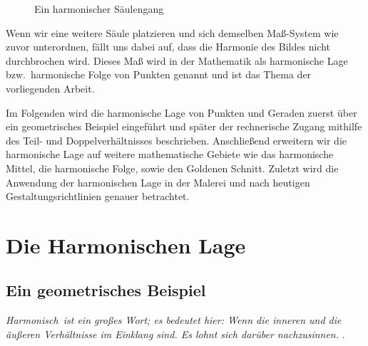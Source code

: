 \documentclass[12pt,a4paper]{article}
\begin{document}
\begin{figure}[htbp]
 \hfill
{}
\caption{Ein harmonischer Säulengang}
\label{fig:saeulen}
\end{figure}

Wenn wir eine weitere Säule platzieren und sich demselben Maß-System wie zuvor unterordnen, fällt uns dabei auf, dass die Harmonie des Bildes nicht durchbrochen wird. Dieses Maß wird in der Mathematik als harmonische Lage bzw.~harmonische Folge von Punkten genannt und ist das Thema der vorliegenden Arbeit.

Im Folgenden wird die harmonische Lage von Punkten und Geraden zuerst über ein geometrisches Beispiel eingeführt und später der rechnerische Zugang mithilfe des Teil- und Doppelverhältnisses beschrieben. Anschließend erweitern wir die harmonische Lage auf weitere mathematische Gebiete wie das harmonische Mittel, die harmonische Folge, sowie den Goldenen Schnitt. Zuletzt wird die Anwendung der harmonischen Lage in der Malerei und nach heutigen Gestaltungsrichtlinien genauer betrachtet.

\newpage
\section{Die Harmonischen Lage}
\label{subsec:dieHarmonischeLage}

\subsection{Ein geometrisches Beispiel}
\textit{\glqq Harmonisch\grqq ~ist ein großes Wort; es bedeutet hier: Wenn die inneren und die äußeren Verhältnisse im Einklang sind. Es lohnt sich darüber nachzusinnen.} \citep[S.~53]{projektiveGeometrie}.
\end{document}
